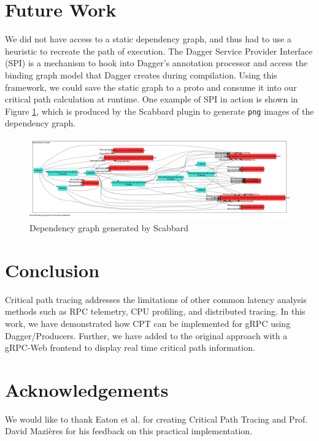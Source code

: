\documentclass[11pt, twoside, twocolumn]{extarticle}
\begin{document}
\section{Future Work}\label{future}

We did not have access to a static dependency graph, and thus had to use a heuristic to recreate the path of execution. The Dagger Service Provider Interface (SPI)\cite{daggerspi} is a mechanism to hook into Dagger’s annotation processor and access the binding graph model that Dagger creates during compilation. Using this framework, we could save the static graph to a proto and consume it into our critical path calculation at runtime. One example of SPI in action is shown in Figure \ref{fig:dependency_graph}, which is produced by the Scabbard\cite{scabbard} plugin to generate \lstinline{png} images of the dependency graph.

\begin{figure}[h]
\includegraphics[width=\linewidth]{ServerProducerModule.png}
\caption[width=\linewidth, scale=1.5]{Dependency graph generated by Scabbard}
\label{fig:dependency_graph}
\end{figure}

\section{Conclusion}

Critical path tracing addresses the limitations of other common latency analysis methods such as RPC telemetry, CPU profiling, and distributed tracing. In this work, we have demonstrated how CPT can be implemented for gRPC using Dagger/Producers.  Further, we have added to the original approach with a gRPC-Web frontend to display real time critical path information.

\section{Acknowledgements}
We would like to thank Eaton et al.\cite{10.1145/3526967} for creating Critical Path Tracing and Prof. David Mazières for his feedback on this practical implementation.

\printbibliography
\end{document}
